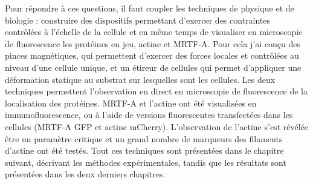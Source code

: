 \documentclass{report}
\begin{document}
Pour répondre à ces questions, il faut coupler les techniques de physique et de biologie : construire des dispositifs permettant d'exercer des contraintes contrôlées à l'échelle de la cellule et en même temps de visualiser en microscopie de fluorescence les protéines en jeu, actine et MRTF-A. 
Pour cela j'ai conçu des pinces magnétiques, qui permettent d'exercer des forces locales et contrôlées au niveau d'une cellule unique, et un étireur de cellules qui permet d'appliquer une déformation statique au substrat sur lesquelles sont les cellules. 
Les deux techniques permettent l'observation en direct en microscopie de fluorescence de la localisation des protéines. 
MRTF-A et l'actine ont été visualisées en immunofluorescence, ou à l'aide de versions fluorescentes transfectées dans les cellules (MRTF-A GFP et actine mCherry). L'observation de l'actine s'est révélée être un paramètre critique et un grand nombre de marqueurs des filaments d'actine ont été testés. 
Tout ces techniques sont présentées dans le chapitre suivant, décrivant les méthodes expérimentales, tandis que les résultats sont présentées dans les deux derniers chapitres. 
\end{document}
